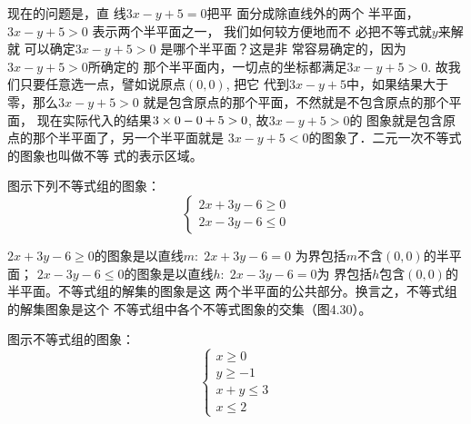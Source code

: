 现在的问题是，直
线$3x-y+5=0$把平
面分成除直线外的两个
半平面，$3x-y+5>0$
表示两个半平面之一，
我们如何较方便地而不
必把不等式就$y$来解就
可以确定$3x-y+5>0$
是哪个半平面？这是非
常容易确定的，因为
$3x-y+5>0$所确定的
那个半平面内，一切点的坐标都满足$3x-y+
5>0$. 故我们只要任意选一点，譬如说原点$(0,0)$, 把它
代到$3x-y+5$中，如果结果大于零，那么$3x-y+5>0$
就是包含原点的那个平面，不然就是不包含原点的那个平面，
现在实际代入的结果$3\times0-0+5>0$, 故$3x-y+5>0$的
图象就是包含原点的那个半平面了，另一个半平面就是
$3x-y+5<0$的图象了．二元一次不等式的图象也叫做不等
式的表示区域。

\begin{example}
图示下列不等式组的图象：
\[\begin{cases}
  2x+3y-6\ge 0\\
2x-3y-6\le 0 
\end{cases}\]
 \end{example}

\begin{solution} 
$2x+3y-6\ge 0$的图象是以直线$m:\; 2x+3y-6=0$
为界包括$m$不含$(0,0)$的半平面；
$2x-3y-6\le 0$的图象是以直线$h:\; 2x-3y-6=0$为
界包括$h$包含$(0,0)$的半平面。不等式组的解集的图象是这
两个半平面的公共部分。换言之，不等式组的解集图象是这个
不等式组中各个不等式图象的交集（图4.30）。

\begin{figure}[htp]
    \centering
{}
    \caption{}
\end{figure}
\end{solution}



\begin{example}
    图示不等式组的图象：
\[\begin{cases}
   x\ge  0\\
    y\ge -1\\
    x+y\le 3\\
    x\le 2
\end{cases}\]
\end{example}



